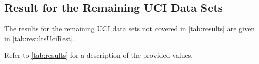 \documentclass[11pt, a4paper, conference, romanappendices, twocolumn]{IEEEtran}
\begin{document}
    \subsection{Result for the Remaining \acs{UCI} Data Sets}  \label{app:remainingResults}
    The results for the remaining \ac{UCI} data sets not covered in \cref{tab:results} are given in \cref{tab:resultsUciRest}.
    \begin{table*}
    	\centering
    	\tabResultsUciRest
    	\caption{
    		Refer to \cref{tab:results} for a description of the provided values.
    	}
    	\label{tab:resultsUciRest}
    \end{table*}
\end{document}
